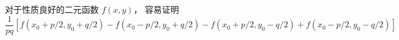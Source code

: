 

对于性质良好的二元函数 $f(x,y)$， 容易证明
\begin{equation}
\frac{1}{pq}[f(x_0+p/2, y_0+q/2) - f(x_0-p/2, y_0+q/2) - f(x_0+p/2, y_0-q/2) + f(x_0-p/2, y_0-q/2)]
\end{equation}

